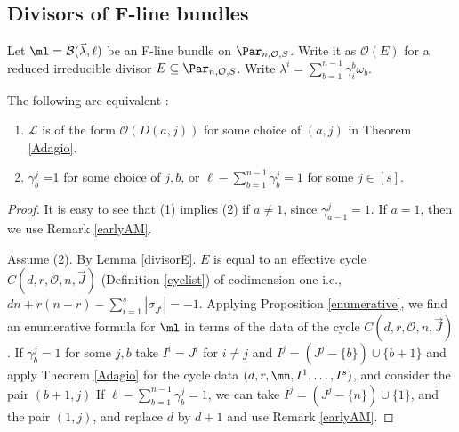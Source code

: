 \subsection{Divisors of F-line bundles}
Let $\ml=\mathcal{B}(\vec{\lambda},\ell)$ be an F-line bundle  on $\Par_{n,\mathcal{O},S}$. Write it as $\mathcal{O}(E)$ for a reduced irreducible divisor  $E\subseteq \Par_{n,\mathcal{O},S}$.
Write $\lambda^i=\sum_{b=1}^{n-1} \gamma_{i}^{b}\omega_b$.

\begin{lemma}
\notready\label{powercord}
The following are equivalent :
\begin{enumerate}
\item $\mathcal{L}$ is of the form $\mathcal{O}(D(a,j))$ for some choice of $(a,j)$ in Theorem \ref{Adagio}.
\item $\gamma^j_b$ =1 for some choice of $j,b$, or $\ell-\sum_{b=1}^{n-1} \gamma^j_b=1$ for some $j\in[s]$.
\end{enumerate}
\end{lemma}
\begin{proof}
It is easy to see that (1) implies (2) if $a\neq 1$, since  $\gamma^j_{a-1}=1$. If $a=1$, then we use Remark \ref{earlyAM}.

Assume (2). By Lemma \ref{divisorE}. $E$ is equal to an effective cycle $C(d,r,\mathcal{O},n,\vec{J})$ (Definition  \ref{cyclist})  of codimension one i.e., $dn  +r(n-r)-\sum_{i=1}^s |\sigma_{J^i}|=-1$. Applying Proposition \ref{enumerative}, we find an enumerative formula for $\ml$ in terms of the data of the cycle $C(d,r,\mathcal{O},n,\vec{J})$. If $\gamma^j_b=1$ for some $j,b$ take $I^i=J^i$ for $i\neq j$ and $I^j=(J^j-\{b\})\cup\{b+1\}$ and apply Theorem \ref{Adagio} for the cycle data $(d,r,\mn,I^1,\dots,I^s)$, and consider the pair $(b+1,j)$   If $\ell-\sum_{b=1}^{n-1} \gamma^j_b=1$, we can take $I^j=(J^j-\{n\})\cup\{1\}$, and the pair $(1,j)$, and replace $d$ by $d+1$ and use Remark \ref{earlyAM}.
\end{proof}
